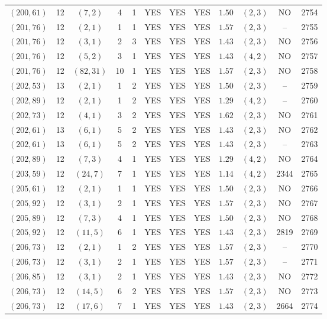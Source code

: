 \begin{longtable}{|c|c|c|c|c|c|c|c|c|c|c|c|}
$(200,61)$ & 12 & $(7,2)$ & 4 & 1 & YES & YES & YES & $1.50$ & $(2,3)$ & NO & 2754\\
$(201,76)$ & 12 & $(2,1)$ & 1 & 1 & YES & YES & YES & $1.57$ & $(2,3)$ & -- & 2755\\
$(201,76)$ & 12 & $(3,1)$ & 2 & 3 & YES & YES & YES & $1.43$ & $(2,3)$ & NO & 2756\\
$(201,76)$ & 12 & $(5,2)$ & 3 & 1 & YES & YES & YES & $1.43$ & $(4,2)$ & NO & 2757\\
$(201,76)$ & 12 & $(82,31)$ & 10 & 1 & YES & YES & YES & $1.57$ & $(2,3)$ & NO & 2758\\
$(202,53)$ & 13 & $(2,1)$ & 1 & 2 & YES & YES & YES & $1.50$ & $(2,3)$ & -- & 2759\\
$(202,89)$ & 12 & $(2,1)$ & 1 & 2 & YES & YES & YES & $1.29$ & $(4,2)$ & -- & 2760\\
$(202,73)$ & 12 & $(4,1)$ & 3 & 2 & YES & YES & YES & $1.62$ & $(2,3)$ & NO & 2761\\
$(202,61)$ & 13 & $(6,1)$ & 5 & 2 & YES & YES & YES & $1.43$ & $(2,3)$ & NO & 2762\\
$(202,61)$ & 13 & $(6,1)$ & 5 & 2 & YES & YES & YES & $1.43$ & $(2,3)$ & -- & 2763\\
$(202,89)$ & 12 & $(7,3)$ & 4 & 1 & YES & YES & YES & $1.29$ & $(4,2)$ & NO & 2764\\
$(203,59)$ & 12 & $(24,7)$ & 7 & 1 & YES & YES & YES & $1.14$ & $(4,2)$ & 2344 & 2765\\
$(205,61)$ & 12 & $(2,1)$ & 1 & 1 & YES & YES & YES & $1.50$ & $(2,3)$ & NO & 2766\\
$(205,92)$ & 12 & $(3,1)$ & 2 & 1 & YES & YES & YES & $1.57$ & $(2,3)$ & NO & 2767\\
$(205,89)$ & 12 & $(7,3)$ & 4 & 1 & YES & YES & YES & $1.50$ & $(2,3)$ & NO & 2768\\
$(205,92)$ & 12 & $(11,5)$ & 6 & 1 & YES & YES & YES & $1.43$ & $(2,3)$ & 2819 & 2769\\
$(206,73)$ & 12 & $(2,1)$ & 1 & 2 & YES & YES & YES & $1.57$ & $(2,3)$ & -- & 2770\\
$(206,73)$ & 12 & $(3,1)$ & 2 & 1 & YES & YES & YES & $1.57$ & $(2,3)$ & -- & 2771\\
$(206,85)$ & 12 & $(3,1)$ & 2 & 1 & YES & YES & YES & $1.43$ & $(2,3)$ & NO & 2772\\
$(206,73)$ & 12 & $(14,5)$ & 6 & 2 & YES & YES & YES & $1.57$ & $(2,3)$ & NO & 2773\\
$(206,73)$ & 12 & $(17,6)$ & 7 & 1 & YES & YES & YES & $1.43$ & $(2,3)$ & 2664 & 2774\\

\end{longtable}
